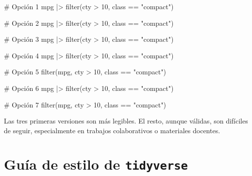 \documentclass[
  spanish,
  letterpaper,
  DIV=11,
  numbers=noendperiod]{scrreprt}
\newenvironment{Shaded}{\begin{snugshade}}{\end{snugshade}}
\newcommand{\CommentTok}[1]{\textcolor[rgb]{0.37,0.37,0.37}{#1}}
\newcommand{\DecValTok}[1]{\textcolor[rgb]{0.68,0.00,0.00}{#1}}
\newcommand{\FunctionTok}[1]{\textcolor[rgb]{0.28,0.35,0.67}{#1}}
\newcommand{\NormalTok}[1]{\textcolor[rgb]{0.00,0.23,0.31}{#1}}
\newcommand{\SpecialCharTok}[1]{\textcolor[rgb]{0.37,0.37,0.37}{#1}}
\newcommand{\StringTok}[1]{\textcolor[rgb]{0.13,0.47,0.30}{#1}}
\begin{document}
\begin{Shaded}
\begin{Highlighting}[]
\CommentTok{\# Opción 1}
\NormalTok{mpg }\SpecialCharTok{|\textgreater{}}
  \FunctionTok{filter}\NormalTok{(cty }\SpecialCharTok{\textgreater{}} \DecValTok{10}\NormalTok{, class }\SpecialCharTok{==} \StringTok{"compact"}\NormalTok{)}

\CommentTok{\# Opción 2}
\NormalTok{mpg }\SpecialCharTok{|\textgreater{}} \FunctionTok{filter}\NormalTok{(cty }\SpecialCharTok{\textgreater{}} \DecValTok{10}\NormalTok{, class }\SpecialCharTok{==} \StringTok{"compact"}\NormalTok{)}

\CommentTok{\# Opción 3}
\NormalTok{mpg }\SpecialCharTok{|\textgreater{}}
  \FunctionTok{filter}\NormalTok{(cty }\SpecialCharTok{\textgreater{}} \DecValTok{10}\NormalTok{, class }\SpecialCharTok{==} \StringTok{"compact"}\NormalTok{)}

\CommentTok{\# Opción 4}
\NormalTok{mpg }\SpecialCharTok{|\textgreater{}} \FunctionTok{filter}\NormalTok{(cty }\SpecialCharTok{\textgreater{}} \DecValTok{10}\NormalTok{, class }\SpecialCharTok{==} \StringTok{"compact"}\NormalTok{)}

\CommentTok{\# Opción 5}
\FunctionTok{filter}\NormalTok{(mpg, cty }\SpecialCharTok{\textgreater{}} \DecValTok{10}\NormalTok{, class }\SpecialCharTok{==} \StringTok{"compact"}\NormalTok{)}

\CommentTok{\# Opción 6}
\NormalTok{mpg }\SpecialCharTok{|\textgreater{}}
  \FunctionTok{filter}\NormalTok{(cty }\SpecialCharTok{\textgreater{}} \DecValTok{10}\NormalTok{, class }\SpecialCharTok{==} \StringTok{"compact"}\NormalTok{)}

\CommentTok{\# Opción 7}
\FunctionTok{filter}\NormalTok{(mpg, cty }\SpecialCharTok{\textgreater{}} \DecValTok{10}\NormalTok{, class }\SpecialCharTok{==} \StringTok{"compact"}\NormalTok{)}
\end{Highlighting}
\end{Shaded}

Las tres primeras versiones son más legibles. El resto, aunque válidas,
son difíciles de seguir, especialmente en trabajos colaborativos o
materiales docentes.

\section{\texorpdfstring{Guía de estilo de
\textbf{\texttt{tidyverse}}}{Guía de estilo de tidyverse}}\label{guuxeda-de-estilo-de-tidyverse}
\end{document}
